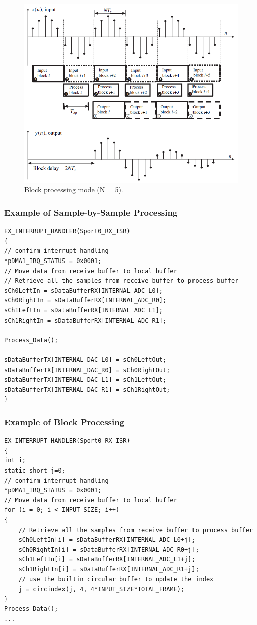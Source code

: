 \begin{figure} [H]
	\centering
	\includegraphics[width=\linewidth]{graphics/18.png}
	\caption{Block processing mode (N = 5).}
	\label{fig:18}
\end{figure}

\subsubsection{Example of Sample-by-Sample Processing}
\begin{verbatim}
EX_INTERRUPT_HANDLER(Sport0_RX_ISR)
{
// confirm interrupt handling
*pDMA1_IRQ_STATUS = 0x0001;
// Move data from receive buffer to local buffer
// Retrieve all the samples from receive buffer to process buffer
sCh0LeftIn = sDataBufferRX[INTERNAL_ADC_L0];
sCh0RightIn = sDataBufferRX[INTERNAL_ADC_R0];
sCh1LeftIn = sDataBufferRX[INTERNAL_ADC_L1];
sCh1RightIn = sDataBufferRX[INTERNAL_ADC_R1];

Process_Data();

sDataBufferTX[INTERNAL_DAC_L0] = sCh0LeftOut;
sDataBufferTX[INTERNAL_DAC_R0] = sCh0RightOut;
sDataBufferTX[INTERNAL_DAC_L1] = sCh1LeftOut;
sDataBufferTX[INTERNAL_DAC_R1] = sCh1RightOut;
}
\end{verbatim}

\subsubsection{Example of Block Processing}
\begin{verbatim}
EX_INTERRUPT_HANDLER(Sport0_RX_ISR)
{
int i;
static short j=0;
// confirm interrupt handling
*pDMA1_IRQ_STATUS = 0x0001;
// Move data from receive buffer to local buffer
for (i = 0; i < INPUT_SIZE; i++)
{
	// Retrieve all the samples from receive buffer to process buffer
	sCh0LeftIn[i] = sDataBufferRX[INTERNAL_ADC_L0+j];
	sCh0RightIn[i] = sDataBufferRX[INTERNAL_ADC_R0+j];
	sCh1LeftIn[i] = sDataBufferRX[INTERNAL_ADC_L1+j];
	sCh1RightIn[i] = sDataBufferRX[INTERNAL_ADC_R1+j];
	// use the builtin circular buffer to update the index
	j = circindex(j, 4, 4*INPUT_SIZE*TOTAL_FRAME);
}
Process_Data();
...
\end{verbatim}

